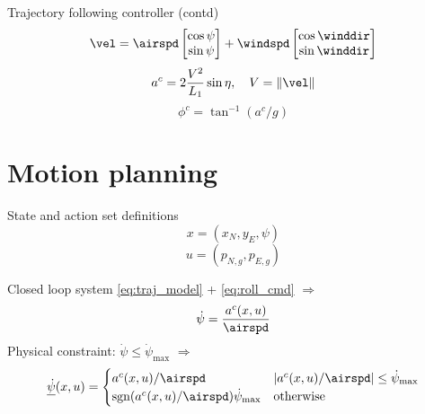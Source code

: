 \documentclass{beamer}
\begin{document}
\begin{frame}{Trajectory following controller (contd)}
    \begin{equation}
        \vel = \airspd\begin{bmatrix}
            \cos\psi \\
            \sin\psi
        \end{bmatrix}
        + \windspd\begin{bmatrix}
            \cos\winddir\\
            \sin\winddir
        \end{bmatrix}
    \end{equation}
    \begin{equation}\label{eq:lat_acc}
        a^{c}=2\frac{V^2}{L_1}\sin\eta, \quad V=\|\vel\|
    \end{equation}
    \begin{equation}\label{eq:roll_cmd}
        \phi^{c}=\tan^{-1}(a^{c}/g)
    \end{equation}
\end{frame}

\section{Motion planning}
\begin{frame}{State and action set definitions}
    \begin{equation}
        x=(x_N, y_E, \psi)
    \end{equation}
    \begin{equation}
        u=(p_{N,g}, p_{E,g})
    \end{equation}
\end{frame}

\begin{frame}{Closed loop system}
    \eqref{eq:traj_model} + \eqref{eq:roll_cmd} $\Rightarrow$
    \begin{equation}
        \dot{\psi}=\frac{a^c(x, u)}{\airspd}
    \end{equation}
    Physical constraint: $\dot{\psi}\leq\dot{\psi}_{\text{max}}$ $\Rightarrow$
    \begin{equation}\label{eq:saturation}
        \underline{\dot{\psi}}(x, u)=\begin{cases}
            a^c(x, u)/\airspd & |a^c(x, u)/\airspd| \leq \dot{\psi}_{\text{max}} \\
            \text{sgn}(a^c(x, u)/\airspd)\dot{\psi}_{\text{max}} & \text{otherwise}
        \end{cases}
    \end{equation}
\end{frame}
\end{document}
